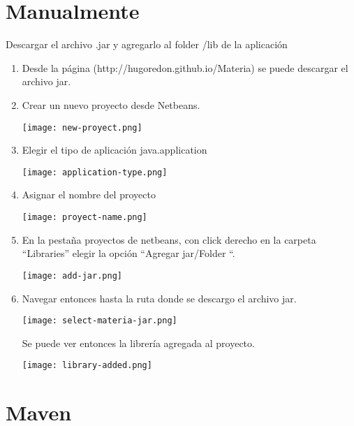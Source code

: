	\section{Manualmente}\label{sec:manualInstall}
		Descargar el archivo .jar y agregarlo al folder /lib de la aplicación
		\begin{enumerate}
			\item Desde la página (http://hugoredon.github.io/Materia) se puede descargar el archivo jar.

			\item Crear un nuevo proyecto desde Netbeans.

			\begin{center}
			  \texttt{[image: new-proyect.png]}
			\end{center}

			\item Elegir el tipo de aplicación java.application 
			\begin{center}
			  \texttt{[image: application-type.png]} 
			\end{center}
			\item Asignar el nombre del proyecto 
			\begin{center}
			  \texttt{[image: proyect-name.png]} 
			\end{center}
			\item En la pestaña proyectos de netbeans, con click derecho en la carpeta “Libraries” elegir la opción “Agregar jar/Folder “.
			\begin{center}
			  \texttt{[image: add-jar.png]} 
			\end{center}


			 \item Navegar entonces hasta la ruta donde se descargo el archivo jar. 

			\begin{center}
			  \texttt{[image: select-materia-jar.png]} 
			\end{center}

			Se puede ver entonces la librería agregada al proyecto.

			\begin{center}
			  \texttt{[image: library-added.png]} 
			\end{center}
		\end{enumerate}

	\section{Maven}\label{sec:mavenInstall}

